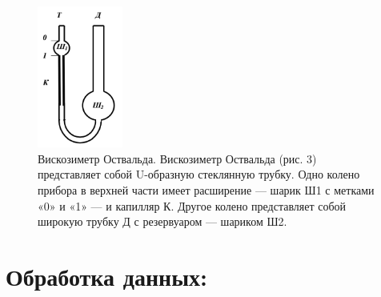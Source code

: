 \documentclass[11pt]{article}
\begin{document}
\begin{figure}[H]
\centering
\captionsetup{justification=centering}
\includegraphics[width=0.25\textwidth]{Pic2.png}
\caption{Вискозиметр Оствальда. Вискозиметр Оствальда (рис. 3) представляет собой U-образную стеклянную трубку. Одно колено прибора в верхней части имеет расширение — шарик Ш1 с метками «0» и «1» — и капилляр К. Другое колено представляет собой широкую трубку Д с резервуаром — шариком Ш2.}
\end{figure}


\section{Обработка данных:}
\end{document}
